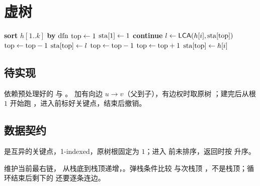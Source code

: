 \section{虚树}\label{sec:virtual-tree}

\begin{algorithm}[H]
    \caption{虚树（单调栈）}
    \begin{algorithmic}[1]
            \State \textbf{sort} $h[1..k]$ \textbf{by} $\pvar{dfn}$
            \State $\pvar{top} \gets 1$
            \State $\pvar{sta}[1] \gets 1$
                    \State \textbf{continue}
                \EndIf
                \State $l \gets \Call{LCA}{h[i], \pvar{sta}[\pvar{top}]}$
                        \State {}
                        \State $\pvar{top} \gets \pvar{top} - 1$
                    \EndWhile
                        \State {}
                        \State $\pvar{sta}[\pvar{top}] \gets l$
                    \Else
                        \State {}
                        \State $\pvar{top} \gets \pvar{top} - 1$
                    \EndIf
                \EndIf
                \State $\pvar{top} \gets \pvar{top} + 1$
                \State $\pvar{sta}[\pvar{top}] \gets h[i]$
            \EndFor
                \State {}
            \EndFor
        \EndProcedure
    \end{algorithmic}
\end{algorithm}

\subsection{待实现}

 依赖预处理好的  与 。 加有向边 $u \to v$（父到子），有边权时取原树 ；建完后从根 $1$ 开始跑 ，进入前标好关键点，结束后撤销。

\subsection{数据契约}

 是互异的关键点，1-indexed，原树根固定为 $1$；进入  前未排序，返回时按  升序。

 维护当前最右链， 从栈底到栈顶递增，。弹栈条件比较  与次栈顶 ，不是栈顶；循环结束后剩下的  还要逐条连边。
